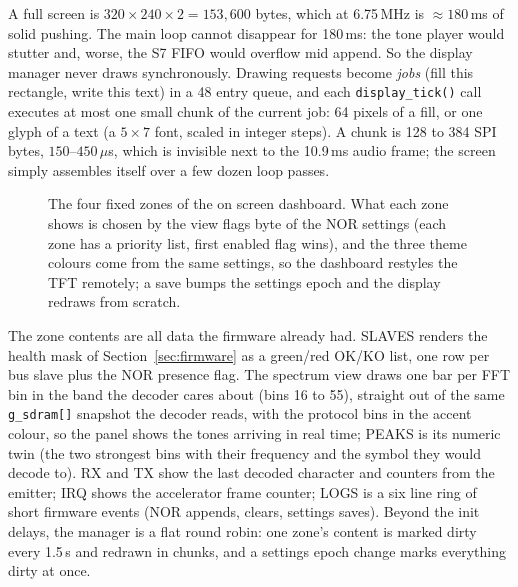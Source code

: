 \documentclass[a4paper,11pt]{article}
\begin{document}
A full screen is $320\times240\times2 = 153{,}600$ bytes, which at 6.75\,MHz is
$\approx180$\,ms of solid pushing. The main loop cannot disappear for 180\,ms:
the tone player would stutter and, worse, the S7 FIFO would overflow mid
append. So the display manager never draws synchronously. Drawing requests
become \emph{jobs} (fill this rectangle, write this text) in a 48 entry queue,
and each \texttt{display\_tick()} call executes at most one small chunk of the
current job: 64 pixels of a fill, or one glyph of a text (a $5\times7$ font,
scaled in integer steps). A chunk is 128 to 384 SPI bytes, $150$--$450\,\mu$s,
which is invisible next to the 10.9\,ms audio frame; the screen simply
assembles itself over a few dozen loop passes.

\begin{figure}[H]
\centering
{}
\caption{The four fixed zones of the on screen dashboard. What each zone shows
is chosen by the view flags byte of the NOR settings (each zone has a priority
list, first enabled flag wins), and the three theme colours come from the same
settings, so the dashboard restyles the TFT remotely; a save bumps the settings
epoch and the display redraws from scratch.}
\label{fig:disp-zones}
\end{figure}

The zone contents are all data the firmware already had. SLAVES renders the
health mask of Section~\ref{sec:firmware} as a green/red OK/KO list, one row
per bus slave plus the NOR presence flag. The spectrum view draws one bar per
FFT bin in the band the decoder cares about (bins 16 to 55), straight out of
the same \texttt{g\_sdram[]} snapshot the decoder reads, with the protocol bins
in the accent colour, so the panel shows the tones arriving in real time; PEAKS
is its numeric twin (the two strongest bins with their frequency and the symbol
they would decode to). RX and TX show the last decoded character and counters
from the emitter; IRQ shows the accelerator frame counter; LOGS is a six line
ring of short firmware events (NOR appends, clears, settings saves). Beyond the
init delays, the manager is a flat round robin: one zone's content is marked
dirty every 1.5\,s and redrawn in chunks, and a settings epoch change marks
everything dirty at once.
\end{document}
